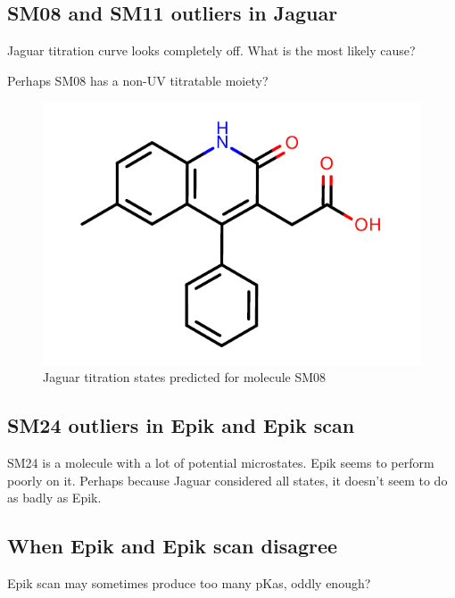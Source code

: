 \documentclass[9pt,lineno,final]{elife}
\begin{document}
\subsection{SM08 and SM11 outliers in Jaguar}

Jaguar titration curve looks completely off. What is the most likely cause?

Perhaps SM08 has a non-UV titratable moiety?

\begin{figure}[H]
    \centering
    \includegraphics[scale=0.5]{Images/Molecules/SM08.pdf}
    \caption{Jaguar titration states predicted for molecule SM08}
    \label{fig:my_label}
\end{figure}


\subsection{SM24 outliers in Epik and Epik scan}

SM24 is a molecule with a lot of potential microstates. Epik seems to perform poorly on it. Perhaps because Jaguar considered all states, it doesn't seem to do as badly as Epik.

\subsection{When Epik and Epik scan disagree}
Epik scan may sometimes produce too many pKas, oddly enough?
\end{document}
